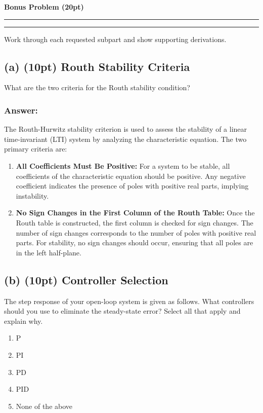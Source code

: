 \documentclass[12pt]{article}
\newcommand{\question}[1]{%
  \clearpage
  \vspace{0.5cm}
  {\noindent\normalsize \textbf{#1}}
  \vspace{0.2cm}
  \hrule
  \vspace{0.1cm}
  \hrule
  \vspace{0.3cm}
}
\begin{document}
\question{Bonus Problem (20pt)}\label{quest:3}
\begin{stepbox}
Work through each requested subpart and show supporting derivations.
\end{stepbox}


\subsection*{(a) (10pt) Routh Stability Criteria}

\noindent
What are the two criteria for the Routh stability condition?

\subsubsection*{Answer:}
The Routh-Hurwitz stability criterion is used to assess the stability of a linear time-invariant (LTI) system by analyzing the characteristic equation. The two primary criteria are:

\begin{enumerate}
    \item \textbf{All Coefficients Must Be Positive:} For a system to be stable, all coefficients of the characteristic equation should be positive. Any negative coefficient indicates the presence of poles with positive real parts, implying instability.
    
    \item \textbf{No Sign Changes in the First Column of the Routh Table:} Once the Routh table is constructed, the first column is checked for sign changes. The number of sign changes corresponds to the number of poles with positive real parts. For stability, no sign changes should occur, ensuring that all poles are in the left half-plane.
\end{enumerate}

\subsection*{(b) (10pt) Controller Selection}

\noindent
The step response of your open-loop system is given as follows. What controllers should you use to eliminate the steady-state error? Select all that apply and explain why.

\begin{enumerate}
    \item P
    \item PI
    \item PD
    \item PID
    \item None of the above
\end{enumerate}
\end{document}
